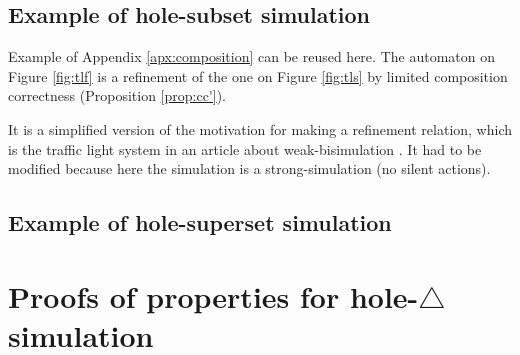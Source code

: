 \documentclass{article}
\begin{document}
\subsection{Example of hole-subset simulation}
Example of Appendix \ref{apx:composition} can be reused here.
The automaton on Figure \ref{fig:tlf} is a refinement of the one on Figure \ref{fig:tls} by limited composition correctness (Proposition \ref{prop:cc'}).

It is a simplified version of the motivation for making a refinement relation, which is the traffic light system in an article about weak-bisimulation \cite{wang:03126313}.
It had to be modified because here the simulation is a strong-simulation (no silent actions).

\subsection{Example of hole-superset simulation}


\section{Proofs of properties for hole-\(\triangle\) simulation}
\end{document}

